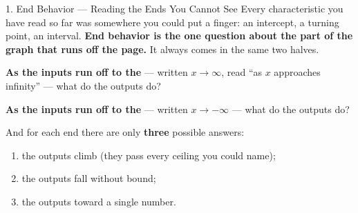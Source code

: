 \documentclass[10pt]{article}
\begin{document}
\boxguard[30]
\begin{notesbox}{1. End Behavior --- Reading the Ends You Cannot See}
\small
Every characteristic you have read so far was somewhere you could put a finger: an intercept, a
turning point, an interval. \textbf{End behavior is the one question about the part of the graph that
runs off the page.} It always comes in the same two halves.

\vspace{4pt}
\textbf{As the inputs run off to the \blank{2.2cm}} --- written $x \to \infty$, read ``as $x$
approaches infinity'' --- what do the outputs do?

\vspace{2pt}
\textbf{As the inputs run off to the \blank{2.2cm}} --- written $x \to -\infty$ --- what do the
outputs do?

\vspace{4pt}
And for each end there are only \textbf{three} possible answers:
\begin{enumerate}[leftmargin=1.5em, itemsep=1pt, topsep=3pt]
  \item the outputs climb \blank{3.0cm} (they pass every ceiling you could name);
  \item the outputs fall without bound;
  \item the outputs \blank{2.6cm} toward a single number.
\end{enumerate}


\end{notesbox}
\end{document}

